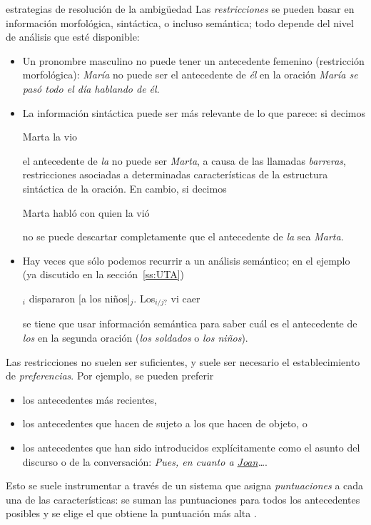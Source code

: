 \begin{persabermes}{estrategias de resolución de la ambigüedad}
Las \emph{restricciones} se pueden basar en información morfológica, sintáctica, o incluso semántica; todo depende del nivel de análisis que esté disponible: \begin{itemize} \item Un pronombre masculino no puede tener un antecedente femenino (restricción morfológica): \emph{María} no puede ser el antecedente de \emph{él} en la oración \emph{María se pasó todo el día hablando de él}. \item La información sintáctica puede ser más relevante de lo que parece: si decimos \begin{exemple} Marta la vio \end{exemple} el antecedente de \emph{la} no puede ser \emph{Marta}, a causa de las llamadas \emph{barreras}, restricciones asociadas a determinadas características de la estructura sintáctica de la oración. En cambio, si decimos \begin{exemple} Marta habló con quien la vió \end{exemple} no se puede descartar completamente que el antecedente de \emph{la} sea \emph{Marta}. \item Hay veces que sólo podemos recurrir a un análisis semántico; en el ejemplo (ya discutido en la sección~\ref{ss:UTA}) \begin{exemple} $_i$ dispararon [a los niños]$_j$. Los$_{i/j?}$ vi caer \end{exemple} se tiene que usar información semántica para saber cuál es el antecedente de \emph{los} en la segunda oración (\emph{los soldados} o \emph{los niños}). \end{itemize} 

Las restricciones no suelen ser suficientes, y suele ser necesario el establecimiento de \emph{preferencias}. Por ejemplo, se pueden preferir \begin{itemize} \item los antecedentes más recientes, \item los antecedentes que hacen de sujeto a los que hacen de objeto, o \item los antecedentes que han sido introducidos explícitamente como el asunto del discurso o de la conversación: \emph{Pues, en cuanto a \underline{Joan}\ldots}. \end{itemize} Esto se suele instrumentar a través de un sistema que asigna \emph{puntuaciones} a cada una de las características: se suman las puntuaciones para todos los antecedentes posibles y se elige el que obtiene la puntuación más alta \citep{lappin94j}. 


\end{persabermes}
